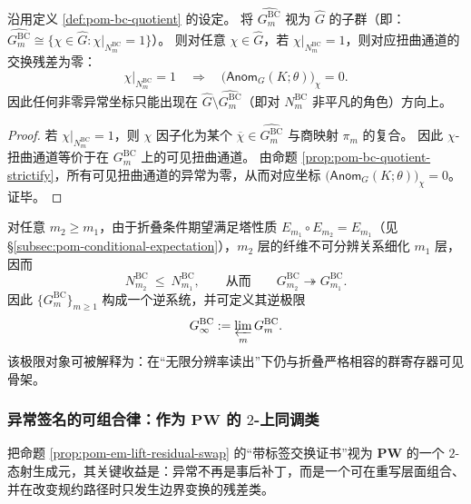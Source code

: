 \begin{corollary}\label{cor:pom-anom-supported-on-bc-kernel}
沿用定义 \ref{def:pom-bc-quotient} 的设定。
将 \(\widehat{G^{\mathrm{BC}}_m}\) 视为 \(\widehat G\) 的子群（即：\(\widehat{G^{\mathrm{BC}}_m}\cong\{\chi\in\widehat G:\chi|_{N^{\mathrm{BC}}_m}=1\}\)）。
则对任意 \(\chi\in\widehat G\)，若 \(\chi|_{N^{\mathrm{BC}}_m}=1\)，则对应扭曲通道的交换残差为零：
\[
\chi|_{N^{\mathrm{BC}}_m}=1
\quad\Longrightarrow\quad
\bigl(\mathsf{Anom}_G(K;\theta)\bigr)_{\chi}=0.
\]
因此任何非零异常坐标只能出现在 \(\widehat G\setminus \widehat{G^{\mathrm{BC}}_m}\)（即对 \(N^{\mathrm{BC}}_m\) 非平凡的角色）方向上。
\end{corollary}
\begin{proof}
若 \(\chi|_{N^{\mathrm{BC}}_m}=1\)，则 \(\chi\) 因子化为某个 \(\overline\chi\in\widehat{G^{\mathrm{BC}}_m}\) 与商映射 \(\pi_m\) 的复合。
因此 \(\chi\)-扭曲通道等价于在 \(G^{\mathrm{BC}}_m\) 上的可见扭曲通道。
由命题 \ref{prop:pom-bc-quotient-strictify}，所有可见扭曲通道的异常为零，从而对应坐标 \(\bigl(\mathsf{Anom}_G(K;\theta)\bigr)_{\chi}=0\)。证毕。
\end{proof}

\begin{corollary}[分辨率塔上的可见寄存器逆系统]\label{cor:pom-bc-inverse-system}
对任意 \(m_2\ge m_1\)，由于折叠条件期望满足塔性质 \(E_{m_1}\circ E_{m_2}=E_{m_1}\)（见 \S\ref{subsec:pom-conditional-expectation}），\(m_2\) 层的纤维不可分辨关系细化 \(m_1\) 层，因而
\[
N^{\mathrm{BC}}_{m_2}\ \le\ N^{\mathrm{BC}}_{m_1},
\qquad\text{从而}\qquad
G^{\mathrm{BC}}_{m_2}\twoheadrightarrow G^{\mathrm{BC}}_{m_1}.
\]
因此 \(\{G^{\mathrm{BC}}_m\}_{m\ge 1}\) 构成一个逆系统，并可定义其逆极限
\[
G^{\mathrm{BC}}_\infty:=\varprojlim_m G^{\mathrm{BC}}_m.
\]
该极限对象可被解释为：在“无限分辨率读出”下仍与折叠严格相容的群寄存器可见骨架。
\end{corollary}

\subsubsection{异常签名的可组合律：作为 \texorpdfstring{$\mathbf{PW}$}{PW} 的 \texorpdfstring{$2$}{2}-上同调类}\label{subsec:pom-anom-cohomology}
把命题 \ref{prop:pom-em-lift-residual-swap} 的“带标签交换证书”视为 \(\mathbf{PW}\) 的一个 \(2\)-态射生成元，其关键收益是：异常不再是事后补丁，而是一个可在重写层面组合、并在改变规约路径时只发生边界变换的残差类。

